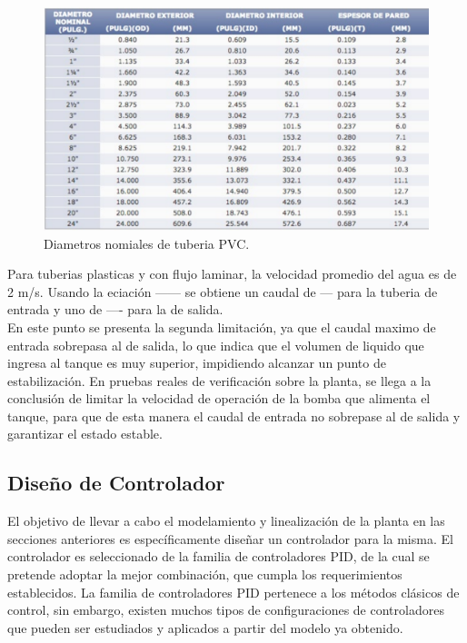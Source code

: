 \documentclass[a4paper,12pt,twoside]{proyectotanquesecci}
\begin{document}
\begin{figure}[h]
\centering
\includegraphics[scale=0.5]{DiametrosPVC}
\renewcommand{\figurename}{Fig.}
\caption{Diametros nomiales de tuberia PVC.}
\label{Diametros nomiales de tuberia PVC.}
\end{figure}

Para tuberias plasticas y con flujo laminar, la velocidad promedio del agua es de 2 m/s. Usando la eciación ------ se obtiene un caudal de --- para la tuberia de entrada y uno de ---- para la de salida. \\ 

En este punto se presenta la segunda limitación, ya que el caudal maximo de entrada sobrepasa al de salida, lo que indica que el volumen de liquido que ingresa al tanque es muy superior, impidiendo alcanzar un punto de estabilización. En pruebas reales de verificación sobre la planta, se llega a la conclusión de limitar la velocidad de operación de la bomba que alimenta el tanque, para que de esta manera el caudal de entrada no sobrepase al de salida y garantizar el estado estable. \\


 





\subsection{Diseño de Controlador}

El objetivo de llevar a cabo el modelamiento y linealización de la planta en las secciones anteriores es específicamente diseñar un controlador para la misma. El controlador es seleccionado de la familia de controladores PID, de la cual se pretende adoptar la mejor combinación, que cumpla los requerimientos establecidos. La familia de controladores PID pertenece a los métodos clásicos de control, sin embargo, existen muchos tipos de configuraciones de controladores que pueden ser estudiados y aplicados a partir del modelo ya obtenido. \\
\end{document}
